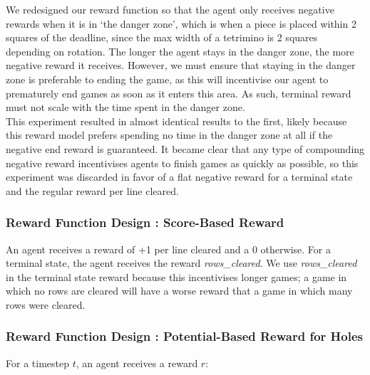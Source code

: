 \documentclass[12pt]{article}
\begin{document}
We redesigned our reward function so that the agent only receives negative rewards when it is in `the danger zone', which is when a piece is placed within 2 squares of the deadline, since the max width of a tetrimino is 2 squares depending on rotation. The longer the agent stays in the danger zone, the more negative reward it receives. However, we must ensure that staying in the danger zone is preferable to ending the game, as this will incentivise our agent to prematurely end games as soon as it enters this area. As such, terminal reward must not scale with the time spent in the danger zone. \\\newline
This experiment resulted in almost identical results to the first, likely because this reward model prefers spending no time in the danger zone at all if the negative end reward is guaranteed. 
It became clear that any type of compounding negative reward incentivises agents to finish games as quickly as possible, so this experiment was discarded in favor of a flat negative reward for a terminal state and the regular reward per line cleared.
\subsubsection{Reward Function Design : Score-Based Reward}
An agent receives a reward of +1 per line cleared and a 0 otherwise. For a terminal state, the agent receives the reward \textit{rows\_cleared}.
We use \textit{rows\_cleared} in the terminal state reward because this incentivises longer games; a game in which no rows are cleared will have a worse reward that a game in which many rows were cleared. 

\subsubsection{Reward Function Design : Potential-Based Reward for Holes}
For a timestep $t$, an agent receives a reward $r$:
\end{document}
